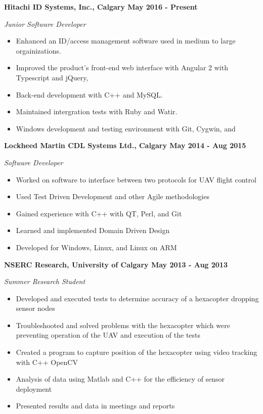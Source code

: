 \documentclass[12pt]{article}
\begin{document}
\bigskip
{}
\medskip

\noindent \centerline{ \bf Hitachi ID Systems, Inc., Calgary \hfill May 2016 - Present}
\indent \emph{ Junior Software Developer }
\begin{itemize}
  \item Enhanced an ID/access management software used in medium to large orgainizations.  
  \item Improved the product's front-end web interface with Angular 2 with Typescript and jQuery, 
  \item Back-end development with C++ and MySQL. 
  \item Maintained intergration tests with Ruby and Watir.
  \item Windows development and testing environment with Git, Cygwin, and 
\end{itemize}

\noindent \centerline{ \bf Lockheed Martin CDL Systems Ltd., Calgary \hfill May 2014 - Aug 2015}
\indent \emph{ Software Developer }
\begin{itemize}
  \item Worked on software to interface between two protocols for UAV flight control
  \item Used Test Driven Development and other Agile methodologies
  \item Gained experience with C++ with QT, Perl, and Git
  \item Learned and implemented Domain Driven Design
  \item Developed for Windows, Linux, and Linux on ARM
\end{itemize}

\noindent \centerline{ \bf NSERC Research, University of Calgary \hfill May 2013 - Aug 2013}
\indent \emph{ Summer Research Student }
\begin{itemize}
  \item Developed and executed tests to determine accuracy of a hexacopter dropping sensor nodes
  \item Troubleshooted and solved problems with the hexacopter which were preventing operation of the UAV and execution of the tests
  \item Created a program to capture position of the hexacopter using video tracking with C++ OpenCV
  \item Analysis of data using Matlab and C++ for the efficiency of sensor deployment
  \item Presented results and data in meetings and reports
\end{itemize}
\end{document}
